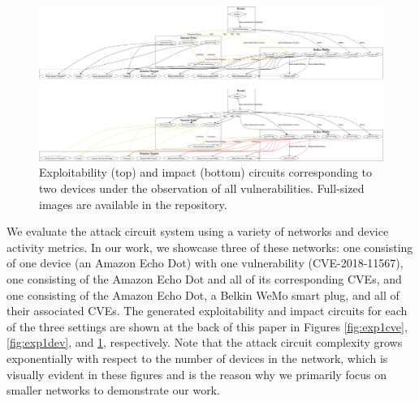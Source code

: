 \begin{figure}[t]
    \centering
    \includegraphics[width=\textwidth]{both2devallcve.png}
    \caption{Exploitability (top) and impact (bottom) circuits corresponding to two devices under the observation of all vulnerabilities. Full-sized images are available in the repository.}
    \label{fig:exp2dev}
\end{figure}

We evaluate the attack circuit system using a variety of networks and device activity metrics. In our work, we showcase three of these networks: one consisting of one device (an Amazon Echo Dot) with one vulnerability (CVE-2018-11567), one consisting of the Amazon Echo Dot and all of its corresponding CVEs, and one consisting of the Amazon Echo Dot, a Belkin WeMo smart plug, and all of their associated CVEs. The generated exploitability and impact circuits for each of the three settings are shown at the back of this paper in Figures \ref{fig:exp1cve}, \ref{fig:exp1dev}, and \ref{fig:exp2dev}, respectively. Note that the attack circuit complexity grows exponentially with respect to the number of devices in the network, which is visually evident in these figures and is the reason why we primarily focus on smaller networks to demonstrate our work. 

